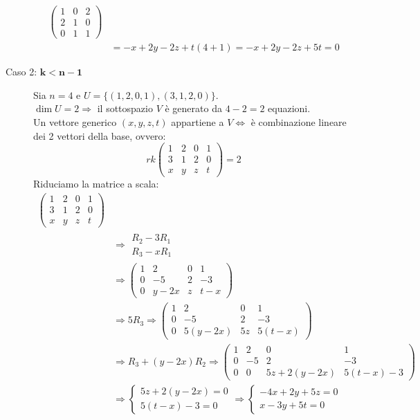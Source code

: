 \documentclass[a4paper]{article}
\theoremstyle{definition}
\begin{document}
\begin{description}
\begin{align*}
\begin{pmatrix}
			1 & 0 & 2 \\
			2 & 1 & 0 \\
			0 & 1 & 1
		\end{pmatrix} \\
		&= - x + 2y - 2z + t(4 + 1) = - x + 2y - 2z + 5t = 0
	\end{align*}
	\item[Caso 2: $\mathbf{k < n - 1}$] Sia $n = 4$ e $U = \{(1, 2, 0, 1), (3, 1, 2, 0)\}$. \\
	$\dim U = 2 \Rightarrow$ il sottospazio $V$ è generato da $4 - 2 = 2$ equazioni. \\
	Un vettore generico $(x, y, z, t)$ appartiene a $V \Leftrightarrow$ è combinazione lineare dei 2 vettori della base, ovvero:
	\[rk\begin{pmatrix}
			1 & 2 & 0 & 1 \\
			3 & 1 & 2 & 0 \\
			x & y & z & t
		\end{pmatrix} = 2\]
	Riduciamo la matrice a scala:
	\begin{align*}
		\begin{pmatrix}
			1 & 2 & 0 & 1 \\
			3 & 1 & 2 & 0 \\
			x & y & z & t
		\end{pmatrix} \\
		&\Rightarrow \begin{matrix}
			R_2 - 3R_1 \\
			R_3 - xR_1
		\end{matrix} \\
		&\Rightarrow \begin{pmatrix}
			1 & 2 & 0 & 1 \\
			0 & -5 & 2 & -3 \\
			0 & y - 2x & z & t - x
		\end{pmatrix} \\
		&\Rightarrow 5R_3 \Rightarrow \begin{pmatrix}
			1 & 2 & 0 & 1 \\
			0 & -5 & 2 & -3 \\
			0 & 5(y - 2x) & 5z & 5(t - x)
		\end{pmatrix} \\
		&\Rightarrow R_3 + (y - 2x)R_2 \Rightarrow \begin{pmatrix}
			1 & 2 & 0 & 1 \\
			0 & -5 & 2 & -3 \\
			0 & 0 & 5z + 2(y - 2x) & 5(t - x) - 3
		\end{pmatrix} \\
		&\Rightarrow \begin{cases}
			5z + 2(y - 2x) = 0 \\
			5(t - x) - 3 = 0
		\end{cases} \Rightarrow \begin{cases}
			- 4x + 2y + 5z = 0 \\
			x - 3y + 5t = 0
		\end{cases}
	\end{align*}
\end{description}
\end{document}
